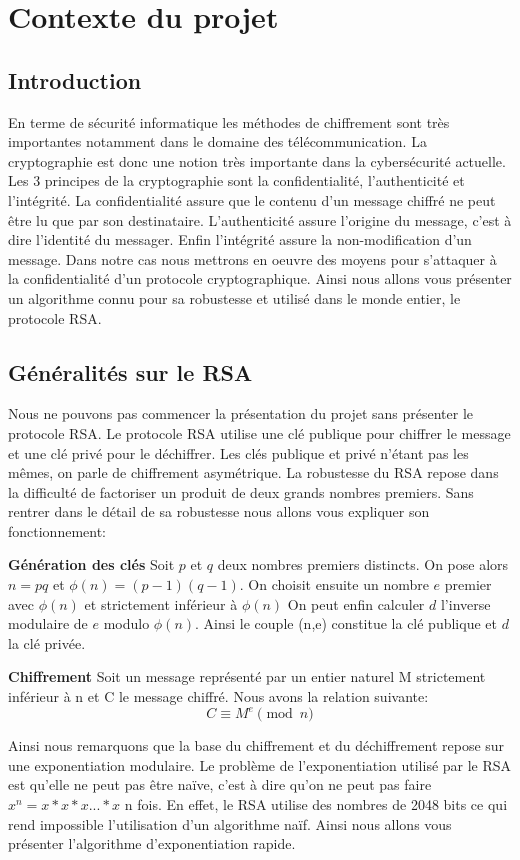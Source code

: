 \section{Contexte du projet}
\subsection{Introduction}
En terme de sécurité informatique les méthodes de chiffrement sont très importantes notamment dans le domaine des télécommunication. La cryptographie est donc une notion très importante dans la cybersécurité actuelle. Les 3 principes de la cryptographie sont la confidentialité, l'authenticité et l'intégrité.
La confidentialité assure que le contenu d'un message chiffré ne peut être lu que par son destinataire.
L'authenticité assure l'origine du message, c'est à dire l'identité du messager.
Enfin l'intégrité assure la non-modification d'un message.
Dans notre cas nous mettrons en oeuvre des moyens pour s'attaquer à la confidentialité d'un protocole cryptographique. 
Ainsi nous allons vous présenter un algorithme connu pour sa robustesse et utilisé dans le monde entier, le protocole RSA.
\newpage
\subsection{Généralités sur le RSA}
Nous ne pouvons pas commencer la présentation du projet sans présenter le protocole RSA.
Le protocole RSA utilise une clé publique pour chiffrer le message et une clé privé pour le déchiffrer. Les clés publique et privé n'étant pas les mêmes, on parle de chiffrement asymétrique.
La robustesse du RSA repose dans la difficulté de factoriser un produit de deux grands nombres premiers.
Sans rentrer dans le détail de sa robustesse nous allons vous expliquer son fonctionnement:


\textbf{Génération des clés}
Soit $p$ et $q$ deux nombres premiers distincts. On pose alors $n=pq$ et $\phi(n)=(p-1)(q-1)$.
On choisit ensuite un nombre $e$ premier avec $\phi(n)$ et strictement inférieur à $\phi(n)$
On peut enfin calculer $d$ l'inverse modulaire de $e$ modulo $\phi(n)$.
Ainsi le couple (n,e) constitue la clé publique et $d$ la clé privée.


\textbf{Chiffrement}
Soit un message représenté par un entier naturel M strictement inférieur à n et C le message chiffré.
Nous avons la relation suivante:
\[
C \equiv M^e \pmod{n}
\]

Ainsi nous remarquons que la base du chiffrement et du déchiffrement repose sur une exponentiation modulaire. Le problème de l'exponentiation utilisé par le RSA est qu'elle ne peut pas être naïve, c'est à dire qu'on ne peut pas faire $ x^n = x*x*x...*x$ n fois. En effet, le RSA utilise des nombres de 2048 bits ce qui rend impossible l'utilisation d'un algorithme naïf.
Ainsi nous allons vous présenter l'algorithme d'exponentiation rapide.
